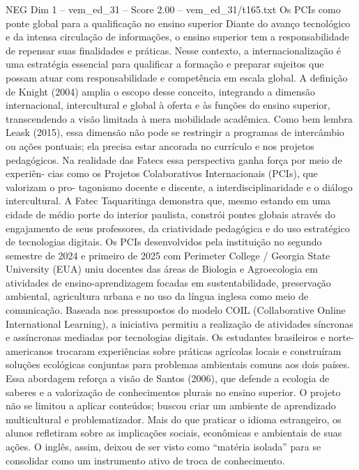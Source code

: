 \begin{textsample}{NEG Dim 1 – vem\_ed\_31 – Score 2.00 – vem\_ed\_31/t165.txt}  \label{ex:f1_neg_088}
Os PCIs como ponte global para a qualificação no ensino superior Diante do avanço tecnológico e da intensa circulação de informações, o ensino superior tem a responsabilidade de repensar suas finalidades e práticas.
Nesse contexto, a internacionalização é uma estratégia essencial para qualificar a formação e preparar sujeitos que possam atuar com responsabilidade e competência em escala global.
A definição de Knight (2004) amplia o escopo desse conceito, integrando a dimensão internacional, intercultural e global à oferta e às funções do ensino superior, transcendendo a visão limitada à mera mobilidade acadêmica.
Como bem lembra Leask (2015), essa dimensão não pode se restringir a programas de intercâmbio ou ações pontuais; ela precisa estar ancorada no currículo e nos projetos pedagógicos.
Na realidade das Fatecs essa perspectiva ganha força por meio de experiên- cias como os Projetos Colaborativos Internacionais (PCIs), que valorizam o pro- tagonismo docente e discente, a interdisciplinaridade e o diálogo intercultural.
A Fatec Taquaritinga demonstra que, mesmo estando em uma cidade de médio porte do interior paulista, constrói pontes globais através do engajamento de seus professores, da criatividade pedagógica e do uso estratégico de tecnologias digitais.
Os PCIs desenvolvidos pela instituição no segundo semestre de 2024 e primeiro de 2025 com Perimeter College / Georgia State University (EUA) uniu docentes das áreas de Biologia e Agroecologia em atividades de ensino-aprendizagem focadas em sustentabilidade, preservação ambiental, agricultura urbana e no uso da língua inglesa como meio de comunicação.
Baseada nos pressupostos do modelo COIL (Collaborative Online International Learning), a iniciativa permitiu a realização de atividades síncronas e assíncronas mediadas por tecnologias digitais.
Os estudantes brasileiros e norte-americanos trocaram experiências sobre práticas agrícolas locais e construíram soluções ecológicas conjuntas para problemas ambientais comuns aos dois países.
Essa abordagem reforça a visão de Santos (2006), que defende a ecologia de saberes e a valorização de conhecimentos plurais no ensino superior.
O projeto não se limitou a aplicar conteúdos; buscou criar um ambiente de aprendizado multicultural e problematizador.
Mais do que praticar o idioma estrangeiro, os alunos refletiram sobre as implicações sociais, econômicas e ambientais de suas ações.
O inglês, assim, deixou de ser visto como “matéria isolada” para se consolidar como um instrumento ativo de troca de conhecimento.

\end{textsample}
